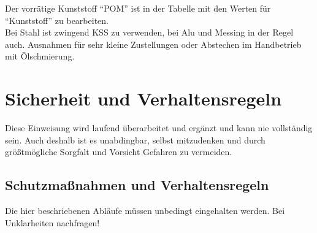 \documentclass{\basedir/fablab-document}
\begin{document}
Der vorrätige Kunststoff \enquote{POM} ist in der Tabelle mit den Werten für \enquote{Kunststoff} zu bearbeiten.\\
Bei Stahl ist zwingend KSS zu verwenden, bei Alu und Messing in der Regel auch. Ausnahmen für sehr kleine Zustellungen oder Abstechen im Handbetrieb mit Ölschmierung.

\newpage
\section{Sicherheit und Verhaltensregeln}

Diese Einweisung wird laufend überarbeitet und ergänzt und kann nie vollständig sein. Auch deshalb ist es unabdingbar, selbst mitzudenken und durch größtmögliche Sorgfalt und Vorsicht Gefahren zu vermeiden.

\subsection{Schutzmaßnahmen und Verhaltensregeln}
Die hier beschriebenen Abläufe müssen unbedingt eingehalten werden.
Bei Unklarheiten nachfragen!
\end{document}
